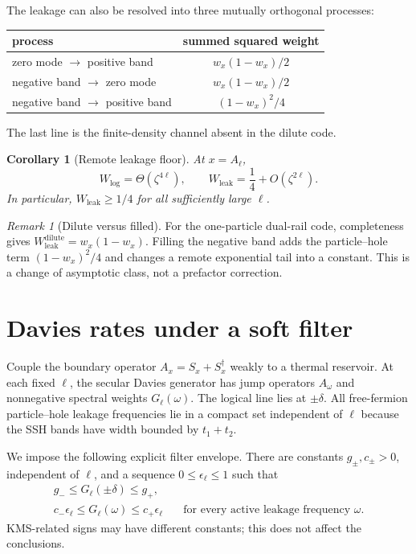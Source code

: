 \documentclass[11pt,a4paper]{article}
\newtheorem{corollary}[theorem]{Corollary}
\theoremstyle{remark}
\newtheorem{remark}[theorem]{Remark}
\begin{document}
The leakage can also be resolved into three mutually orthogonal processes:
\begin{center}
\begin{tabular}{@{}lc@{}}
\toprule
process & summed squared weight\\
\midrule
zero mode $\to$ positive band & $w_x(1-w_x)/2$\\
negative band $\to$ zero mode & $w_x(1-w_x)/2$\\
negative band $\to$ positive band & $(1-w_x)^2/4$\\
\bottomrule
\end{tabular}
\end{center}
The last line is the finite-density channel absent in the dilute code.

\begin{corollary}[Remote leakage floor]\label{cor:floor}
At $x=A_\ell$,
\[
 W_{\log}=\Theta(\zeta^{4\ell}),
 \qquad
 W_{\mathrm{leak}}=\frac14+O(\zeta^{2\ell}).
\]
In particular, $W_{\mathrm{leak}}\ge1/4$ for all sufficiently large $\ell$.
\end{corollary}

\begin{remark}[Dilute versus filled]
For the one-particle dual-rail code, completeness gives $W_{\mathrm{leak}}^{\mathrm{dilute}}=w_x(1-w_x)$.  Filling the negative band adds the particle--hole term $(1-w_x)^2/4$ and changes a remote exponential tail into a constant.  This is a change of asymptotic class, not a prefactor correction.
\end{remark}

\section{Davies rates under a soft filter}

Couple the boundary operator $A_x=S_x+S_x^\dagger$ weakly to a thermal reservoir.  At each fixed $\ell$, the secular Davies generator has jump operators $A_\omega$ and nonnegative spectral weights $G_\ell(\omega)$.  The logical line lies at $\pm\delta$.  All free-fermion particle--hole leakage frequencies lie in a compact set independent of $\ell$ because the SSH bands have width bounded by $t_1+t_2$.

We impose the following explicit filter envelope.  There are constants $g_\pm,c_\pm>0$, independent of $\ell$, and a sequence $0\le\epsilon_\ell\le1$ such that
\begin{align}
 g_-\le G_\ell(\pm\delta)\le g_+,&\label{eq:logicalenvelope}\\
 c_-\epsilon_\ell\le G_\ell(\omega)\le c_+\epsilon_\ell
 &\quad\text{for every active leakage frequency }\omega.\label{eq:tailenvelope}
\end{align}
KMS-related signs may have different constants; this does not affect the conclusions.
\end{document}
